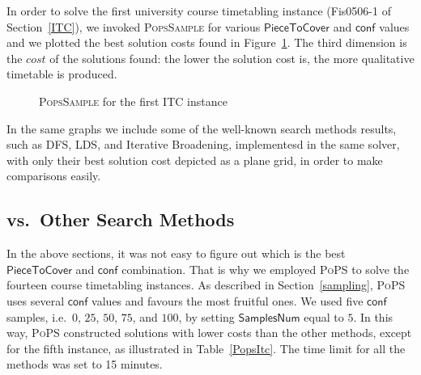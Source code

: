 \documentclass{ws-ijait}
\begin{document}
In order to solve the first university course timetabling instance (\textsf{Fis0506-1} of Section~\ref{ITC}), we invoked \textsc{PopsSample} for various $\mathsf{PieceToCover}$ and $\mathsf{conf}$ values and we plotted the best solution costs found in Figure~\ref{ITC1}. The third dimension is the $cost$ of the solutions found: the lower the solution cost is, the more qualitative timetable is produced.

\begin{figure}
\centering

\caption{{\normalfont\textsc{PopsSample}} for the first ITC instance\label{ITC1}}
\end{figure}

In the same graphs we include some of the well-known search methods results, such as DFS, LDS, and Iterative Broadening, implementesd in the same solver, with only their best solution cost depicted as a plane grid, in order to make comparisons easily.



\subsection{\PoPS{} vs.\ Other Search Methods}

In the above sections, it was not easy to figure out which is the best $\mathsf{PieceToCover}$ and $\mathsf{conf}$ combination. That is why we employed \textsc{PoPS} to solve the fourteen course timetabling instances. As described in Section~\ref{sampling}, \textsc{PoPS} uses several $\mathsf{conf}$ values and favours the most fruitful ones. We used five $\mathsf{conf}$ samples, i.e.\ $0$, $25$, $50$, $75$, and $100$, by setting $\mathsf{SamplesNum}$ equal to $5$. In this way, \textsc{PoPS} constructed solutions with lower costs than the other methods, except for the fifth instance, as illustrated in Table~\ref{PopsItc}. The time limit for all the methods was set to 15 minutes.
\end{document}
